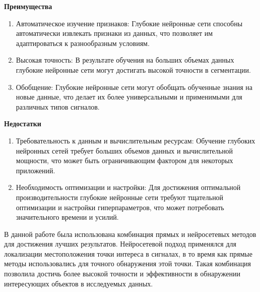 \noindent
\begin{minipage}[t]{.45\textwidth}
	\begin{center}
		\textbf{Преимущества}
	\end{center}

	\begin{enumerate}
		\item Автоматическое изучение признаков: Глубокие нейронные сети
		способны автоматически извлекать признаки из данных, что позволяет им
		адаптироваться к разнообразным условиям.

		\item Высокая точность: В результате обучения на больших объемах данных
		глубокие нейронные сети могут достигать высокой точности в сегментации.

		\item Обобщение: Глубокие нейронные сети могут обобщать обученные
		знания на новые данные, что делает их более универсальными и
		применимыми для различных типов сигналов.
	\end{enumerate}
\end{minipage}
\hfill
\begin{minipage}[t]{.45\textwidth}
	\begin{center}
		\textbf{Недостатки}
	\end{center}

	\begin{enumerate}
		\item Требовательность к данным и вычислительным ресурсам: Обучение
		глубоких нейронных сетей требует больших объемов данных и
		вычислительной мощности, что может быть ограничивающим фактором для
		некоторых приложений.

		\item Необходимость оптимизации и настройки: Для достижения оптимальной
		производительности глубокие нейронные сети требуют тщательной
		оптимизации и настройки гиперпараметров, что может потребовать
		значительного времени и усилий.
	\end{enumerate}
\end{minipage}


\newpage
В данной работе была использована комбинация прямых и нейросетевых методов для
достижения лучших результатов. Нейросетевой подход применялся для локализации
местоположения точки интереса в сигналах, в то время как прямые методы
использовались для точного обнаружения этой точки. Такая комбинация позволила
достичь более высокой точности и эффективности в обнаружении интересующих
объектов в исследуемых данных.

